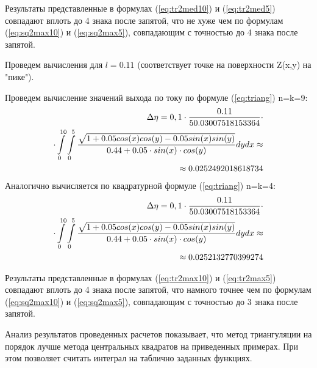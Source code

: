 \documentclass{article}
\begin{document}
Результаты представленные в формулах (\ref{eq:tr2med10}) и (\ref{eq:tr2med5}) совпадают вплоть до 4 знака после запятой, что не хуже чем по формулам (\ref{eq:sq2max10}) и (\ref{eq:sq2max5}), совпадающим с точностью до 4 знака после запятой.

Проведем вычисления для $l=0.11$ (соответствует точке на поверхности Z(x,y) на "пике").

Проведем вычисление значений выхода по току по формуле (\ref{eq:triang}) n=k=9:
\begin{align}\label{eq:tr2max10}
\Delta \eta = 0,1 \cdot \frac{0.11}{50.03007518153364} \cdot \notag \\
\cdot \int\limits_0^{10} \int\limits_0^5 \frac{\sqrt{1+0.05cos(x)cos(y)-0.05 sin(x)sin(y)}}{0.44 + 0.05 \cdot sin(x) \cdot cos(y)} dy dx \approx \notag \\ \approx 0.0252492018618734
\end{align}
Аналогично вычисляется по квадратурной формуле (\ref{eq:triang}) n=k=4:
\begin{align}\label{eq:tr2max5}
\Delta \eta = 0,1 \cdot \frac{0.11}{50.03007518153364} \cdot \notag \\
\cdot \int\limits_0^{10} \int\limits_0^5 \frac{\sqrt{1+0.05cos(x)cos(y)-0.05 sin(x)sin(y)}}{0.44 + 0.05 \cdot sin(x) \cdot cos(y)} dy dx \approx \notag \\ \approx 0.0252132770399274
\end{align}

Результаты представленные в формулах (\ref{eq:tr2max10}) и (\ref{eq:tr2max5}) совпадают вплоть до 4 знака после запятой, что намного точнее чем по формулам (\ref{eq:sq2max10}) и (\ref{eq:sq2max5}), совпадающим с точностью до 3 знака после запятой.

Анализ результатов проведенных расчетов показывает, что метод триангуляции на порядок лучше метода центральных квадратов на приведенных примерах. При этом позволяет считать интеграл на таблично заданных функциях.


\newpage
 
 
\end{document}
